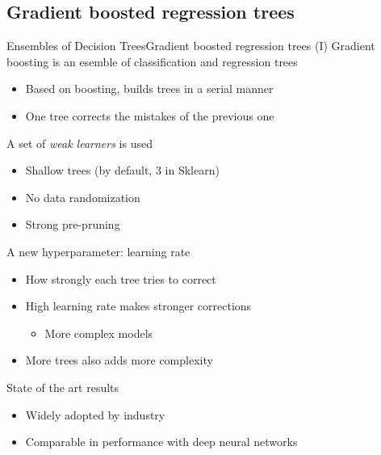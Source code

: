 \documentclass[10pt,compress]{beamer} %
\begin{document}
\subsection{Gradient boosted regression trees}
\begin{frame}{Ensembles of Decision Trees}{Gradient boosted regression trees (I)}
    \alert{Gradient boosting} is an esemble of classification and regression trees 
    \begin{itemize}
        \item Based on boosting, builds trees in a serial manner
        \item One tree corrects the mistakes of the previous one
    \end{itemize}

    A set of \textit{weak learners} is used
    \begin{itemize}
        \item Shallow trees (by default, $3$ in Sklearn)
        \item No data randomization
        \item Strong pre-pruning
    \end{itemize}

    A new hyperparameter: learning rate
    \begin{itemize}
        \item How strongly each tree tries to correct
        \item High learning rate makes stronger corrections
        \begin{itemize}
            \item More complex models
        \end{itemize}
        \item More trees also adds more complexity
    \end{itemize}

    State of the art results
    \begin{itemize}
        \item Widely adopted by industry
        \item Comparable in performance with deep neural networks
    \end{itemize}
\end{frame}
\end{document}
